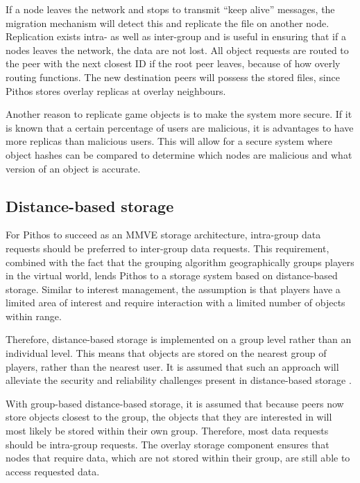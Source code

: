 If a node leaves the network and stops to transmit ``keep alive'' messages, the migration mechanism will detect this and replicate the file on
another node. Replication exists intra- as well as inter-group and is useful in ensuring that if a nodes leaves the network, the data are not lost.
All object requests are routed to the peer with the next closest ID if the root peer leaves, because of how overly routing functions. The new
destination peers will possess the stored files, since Pithos stores overlay replicas at overlay neighbours.

Another reason to replicate game objects is to make the system more secure. If it is known that a certain percentage of users are malicious, it is
advantages to have more replicas than malicious users. This will allow for a secure system where object hashes can be compared to determine which
nodes are malicious and what version of an object is accurate.

\subsection{Distance-based storage}
\label{distance_based}

For Pithos to succeed as an MMVE storage architecture, intra-group data requests should be preferred to inter-group data requests. This requirement,
combined with the fact that the grouping algorithm geographically groups players in the virtual world, lends Pithos to a storage system based on
distance-based storage. Similar to interest management, the assumption is that players have a limited area of interest and require interaction with a
limited number of objects within range.

Therefore, distance-based storage is implemented on a group level rather than an individual level. This means that objects are stored on the nearest
group of players, rather than the nearest user. It is assumed that such an approach will alleviate the security and reliability challenges present in
distance-based storage \cite{gilmore_p2p_mmog_state_persistency}.

With group-based distance-based storage, it is assumed that because peers now store objects closest to the group, the objects that they are
interested in will most likely be stored within their own group. Therefore, most data requests should be intra-group requests. The overlay storage
component ensures that nodes that require data, which are not stored within their group, are still able to access requested data.

